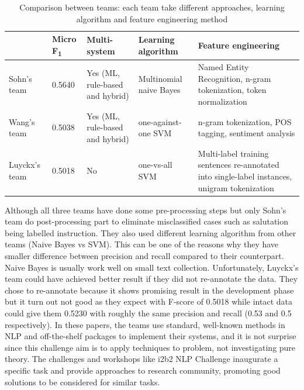 \begin{table}
\small
\noindent\begin{tabularx}{\textwidth}{llXXX}

\toprule
                    & Micro F\textsubscript{1}        &   Multi-system                              &  Learning algorithm            &   Feature engineering\\ 
\midrule
Sohn's team &  0.5640                & Yes (ML, rule-based and hybrid) &  Multinomial naive Bayes    &  Named Entity Recognition, n-gram tokenization, token normalization \\
Wang's team&  0.5038                & Yes (ML, rule-based and hybrid) & one-against-one SVM        &   n-gram tokenization, POS tagging, sentiment analysis\\
Luyckx's team&  0.5018              & No                                                & one-vs-all SVM                   & Multi-label training sentences re-annotated into single-label instances, unigram tokenization\\	

\bottomrule
\end{tabularx}
\caption{Comparison between teams: each team take different approaches, learning algorithm and feature engineering method}
\label{tab:teams}
\end{table}

Although all three teams have done some pre-processing steps but only Sohn's team do post-processing part to eliminate misclassified cases such as salutation being labelled instruction. They also used different learning algorithm from other teams (Naive Bayes vs SVM). This can be one of the reasons why they have smaller difference between precision and recall compared to their counterpart. Naive Bayes is usually work well on small text collection. Unfortunately, Luyckx's team could have achieved better result if they did not re-annotate the data. They chose to re-annotate because it shows promising result in the development phase but it turn out not good as they expect with F-score of 0.5018 while intact data could give them 0.5230 with roughly the same precision and recall (0.53 and 0.5 respectively). In these papers, the teams use standard, well-known methods in NLP and off-the-shelf packages to implement their systems, and it is not surprise since this challenge aim is to apply techniques to problem, not investigating pure theory. The challenges and workshops like i2b2 NLP Challenge inaugurate a specific task and
provide approaches to research community, promoting good solutions to be considered for similar tasks.\\

